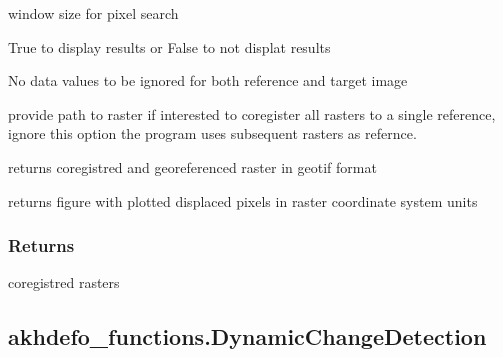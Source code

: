 \documentclass[letterpaper,10pt]{sphinxmanual}
\begin{document}
\begin{fulllineitems}
\begin{description}
\sphinxAtStartPar
window size for pixel search

\sphinxAtStartPar
True to display results or False to not displat results

\sphinxAtStartPar
No data values to be ignored for both reference and target image

\sphinxAtStartPar
provide path to raster if interested to coregister all rasters to a single reference, ignore this option the program uses subsequent rasters as refernce.

\sphinxAtStartPar
returns coregistred and georeferenced raster in geotif format

\sphinxAtStartPar
returns figure with plotted displaced pixels in raster coordinate system units

\end{description}


\subsubsection{Returns}
\label{\detokenize{generated/akhdefo_functions.Coregistration:returns}}
\sphinxAtStartPar
coregistred rasters

\end{fulllineitems}


\sphinxstepscope


\subsection{akhdefo\_functions.DynamicChangeDetection}
\label{\detokenize{generated/akhdefo_functions.DynamicChangeDetection:akhdefo-functions-dynamicchangedetection}}\label{\detokenize{generated/akhdefo_functions.DynamicChangeDetection::doc}}
\end{document}
